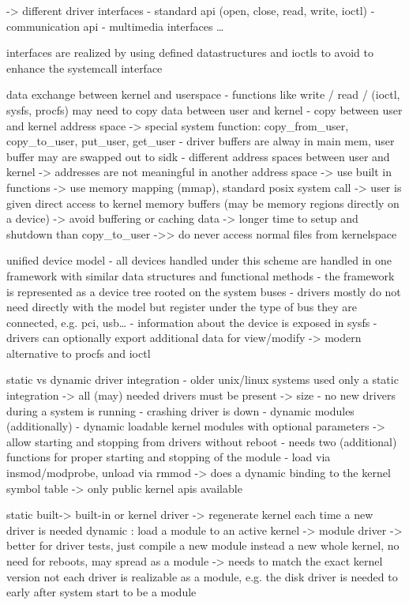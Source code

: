 \cite{quade2016Linux}
-> different driver interfaces
    - standard api (open, close, read, write, ioctl)
    - communication api
    - multimedia interfaces \ldots

    interfaces are realized by using defined datastructures and ioctls to avoid to enhance the systemcall interface

data exchange between kernel and userspace
- functions like write / read / (ioctl, sysfs, procfs) may need to copy data between user and kernel
- copy between user and kernel address space -> special system function: copy_from_user, copy_to_user, put_user, get_user
- driver buffers are alway in main mem, user buffer may are swapped out to sidk
\cite{lfd430}
- different address spaces between user and kernel -> addresses are not meaningful in another address space
-> use built in functions
-> use memory mapping (mmap), standard posix system call -> user is given direct access to kernel memory buffers (may be memory regions directly on a device) -> avoid buffering or caching data -> longer time to setup and shutdown than copy_to_user
->> do never access normal files from kernelspace

\cite{lfd430}
unified device model
- all devices handled under this scheme are handled in one framework with similar data structures and functional methods
- the framework is represented as a device tree rooted on the system buses
- drivers mostly do not need directly with the model but register under the type of bus they are connected, e.g. pci, usb\ldots
- information about the device is exposed in sysfs
- drivers can optionally export additional data for view/modify -> modern alternative to procfs and ioctl



static vs dynamic driver integration
- older unix/linux systems used only a static integration -> all (may) needed drivers must be present -> size
    - no new drivers during a system is running
    - crashing driver is down
- dynamic modules (additionally) 
    - dynamic loadable kernel modules with optional parameters -> allow starting and stopping from drivers without reboot
    - needs two (additional) functions for proper starting and stopping of the module
    - load via insmod/modprobe, unload via rmmod -> does a dynamic binding to the kernel symbol table -> only public kernel apis available

\cite{quade2016Linux}
    static built-> built-in or kernel driver -> regenerate kernel each time a new driver is needed
    dynamic : load a module to an active kernel -> module driver -> better for driver tests, just compile a new module instead a new whole kernel, no need for reboots, may spread as a module -> needs to match the exact kernel version
    not each driver is realizable as a module, e.g. the disk driver is needed to early after system start to be a module

